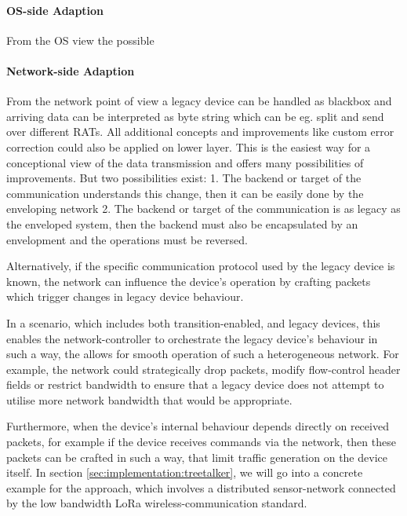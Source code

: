 \paragraph{OS-side Adaption}

From the OS view the possible 

\paragraph{Network-side Adaption}

From the network point of view a legacy device can be handled as blackbox and arriving data can be interpreted as byte string which can be eg. split and send over different RATs. 
All additional concepts and improvements like custom error correction could also be applied on lower layer. 
This is the easiest way for a conceptional view of the data transmission and offers many possibilities of improvements.
But two possibilities exist:
1. The backend or target of the communication understands this change, then it can be easily done by the enveloping network
2. The backend or target of the communication is as legacy as the enveloped system, then the backend must also be encapsulated by an envelopment and the operations must be reversed.  

Alternatively, if the specific communication protocol used by the legacy device is known, the network can influence the device's operation by crafting packets which trigger changes in legacy device behaviour.

In a scenario, which includes both transition-enabled, and legacy devices, this enables the network-controller to orchestrate the legacy device's behaviour in such a way, the allows for smooth operation of such a heterogeneous network.
For example, the network could strategically drop packets, modify flow-control header fields or restrict bandwidth to ensure that a legacy device does not attempt to utilise more network bandwidth that would be appropriate.

Furthermore, when the device's internal behaviour depends directly on received packets, for example if the device receives commands via the network, then these packets can be crafted in such a way, that limit traffic generation on the device itself.
In section \ref{sec:implementation:treetalker}, we will go into a concrete example for the approach, which involves a distributed sensor-network connected by the low bandwidth LoRa wireless-communication standard.


